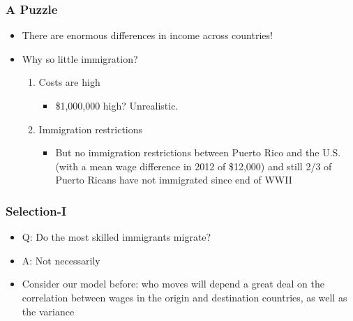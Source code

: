 \documentclass{beamer}
\begin{document}
\begin{frame}
\frametitle{A Puzzle}
\begin{itemize}
\item There are enormous differences in income across countries!
\bigskip
\item Why so little immigration?
\bigskip
\begin{enumerate}
\item Costs are high
\bigskip
\begin{itemize}
\item<2-> \$1,000,000 high?  Unrealistic.
\bigskip
\end{itemize}
\item<3-> Immigration restrictions
\bigskip
\begin{itemize}
\item<4-> But no immigration restrictions between Puerto Rico and the U.S. (with a mean wage difference in 2012 of \$12,000) and still 2/3 of Puerto Ricans have not immigrated since end of WWII
\end{itemize}
\end{enumerate}
\end{itemize}
\end{frame}


\begin{frame}
\frametitle{Selection-I}
\begin{itemize}
\item Q:  Do the most skilled immigrants migrate?  
\bigskip
\item<-2> A:  Not necessarily
\bigskip
\item Consider our model before: who moves will depend a great deal on the correlation between wages in the origin and destination countries, as well as the variance

\end{itemize}
\end{frame}
\end{document}
